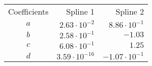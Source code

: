 \begin{tabular}{crr}
    \toprule
    Coefficients & Spline 1 & Spline 2 \\ \otoprule
    $a$ & $2.63 \cdot 10^{-2}$ & $8.86 \cdot 10^{-1}$ \\
    $b$ & $2.58 \cdot 10^{-1}$ & $-1.03$ \\
    $c$ & $6.08 \cdot 10^{-1}$ & $1.25$ \\
    $d$ & $3.59 \cdot 10^{-16}$ & $-1.07 \cdot 10^{-1}$ \\
    \bottomrule
\end{tabular}
